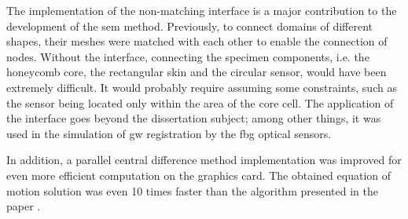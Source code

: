 The implementation of the non-matching interface is a major contribution to the development of the \ac{sem} method.
Previously, to connect domains of different shapes, their meshes were matched with each other to enable the connection of nodes.
Without the interface, connecting the specimen components, i.e. the honeycomb core, the rectangular skin and the circular sensor, would have been extremely difficult.
It would probably require assuming some constraints, such as the sensor being located only within the area of the core cell.
The application of the interface goes beyond the dissertation subject; among other things, it was used in the simulation of \ac{gw} registration by the \ac{fbg} optical sensors.

In addition, a parallel central difference method implementation was improved for even more efficient computation on the graphics card.
The obtained equation of motion solution was even 10 times faster than the algorithm presented in the paper \cite{kudela2020parallel}.

